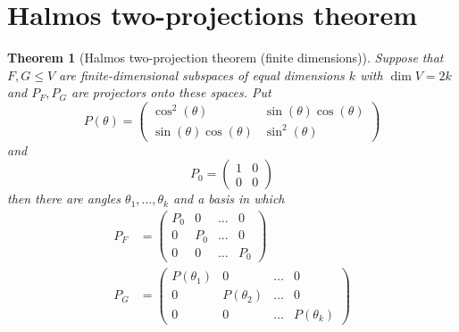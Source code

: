 \documentclass[11pt]{article}
\newtheorem{thm}{Theorem}
\begin{document}
\section{Halmos two-projections theorem}
\begin{thm}[Halmos two-projection theorem (finite dimensions)]
Suppose that $F, G \leq V$ are finite-dimensional subspaces of equal dimensions $k$ with $\dim V = 2k$ and $P_F, P_G$ are projectors onto these spaces. Put
$$
P(\theta) = \begin{pmatrix}\cos^{2}(\theta) & \sin(\theta)\cos(\theta) \\ \sin(\theta)\cos(\theta)  & \sin^{2}(\theta)\end{pmatrix}
$$
and
$$
P_0 = \begin{pmatrix}1 & 0 \\ 0 & 0\end{pmatrix}
$$
then there are angles $\theta_1, \dots, \theta_k$ and a basis in which
\begin{align}
    P_F &= \begin{pmatrix}P_0 & 0 & \dots & 0 \\ 0 & P_0 & \dots & 0 \\ 0 & 0 & \dots & P_0\end{pmatrix} \\
    P_G &= \begin{pmatrix}P(\theta_1) & 0 & \dots & 0\\ 0 & P(\theta_2) & \dots & 0 \\ 0 & 0 & \dots & P(\theta_k)\end{pmatrix}
\end{align}
\end{thm}
\end{document}
